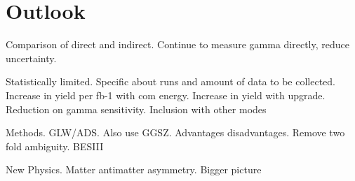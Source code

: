 \section{Outlook}

Comparison of direct and indirect. Continue to measure gamma directly, reduce uncertainty. 

Statistically limited. Specific about runs and amount of data to be collected. Increase in yield per fb-1 with com energy. Increase in yield with upgrade. Reduction on gamma sensitivity. Inclusion with other modes

Methods. GLW/ADS. Also use GGSZ. Advantages disadvantages. Remove two fold ambiguity. BESIII

New Physics. Matter antimatter asymmetry. Bigger picture